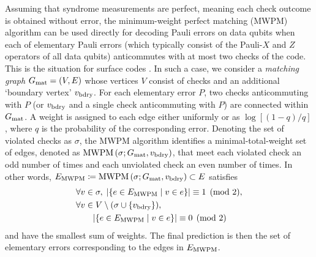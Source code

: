 \documentclass[a4paper,twocolumn,11pt,accepted=2025-01-21]{quantumarticle}
\theoremstyle{definition}
\theoremstyle{definition}
\theoremstyle{definition}
\begin{document}
Assuming that syndrome measurements are perfect, meaning each check outcome is obtained without error, the minimum-weight perfect matching (MWPM) algorithm \cite{edmonds1965paths} can be used directly for decoding Pauli errors on data qubits when each of elementary Pauli errors (which typically consist of the Pauli-$X$ and $Z$ operators of all data qubits) anticommutes with at most two checks of the code. 
This is the situation for surface codes \cite{bravyi1998quantum}.
In such a case, we consider a \emph{matching graph} $G_{\mathrm{mat}} = (V, E)$ whose vertices $V$ consist of checks and an additional `boundary vertex' $v_{\mathrm{bdry}}$.
For each elementary error $P$, two checks anticommuting with $P$ (or $v_{\mathrm{bdry}}$ and a single check anticommuting with $P$) are connected within $G_{\mathrm{mat}}$.
A weight is assigned to each edge either uniformly or as $\log[(1-q)/q]$, where $q$ is the probability of the corresponding error.
Denoting the set of violated checks as $\sigma$, the MWPM algorithm identifies a minimal-total-weight set of edges, denoted as $\operatorname{MWPM}\qty(\sigma;G_{\mathrm{mat}},v_{\mathrm{bdry}})$, that meet each violated check an odd number of times and each unviolated check an even number of times.
In other words, $E_{\mathrm{MWPM}} \coloneqq \operatorname{MWPM}\qty(\sigma;G_{\mathrm{mat}},v_{\mathrm{bdry}}) \subset E$ satisfies
\begin{align*}
    &\forall v \in \sigma, \; \abs{\qty{e \in E_{\mathrm{MWPM}} \mid v \in e}} \equiv 1 \pmod{2}, \\ 
    &\forall v \in V \setminus \qty(\sigma \cup \qty{v_{\mathrm{bdry}}}), \; \\
    &\qquad \abs{\qty{e \in E_{\mathrm{MWPM}} \mid v \in e}} \equiv 0 \pmod{2}
\end{align*}
and have the smallest sum of weights.
The final prediction is then the set of elementary errors corresponding to the edges in $E_{\mathrm{MWPM}}$.
\end{document}
